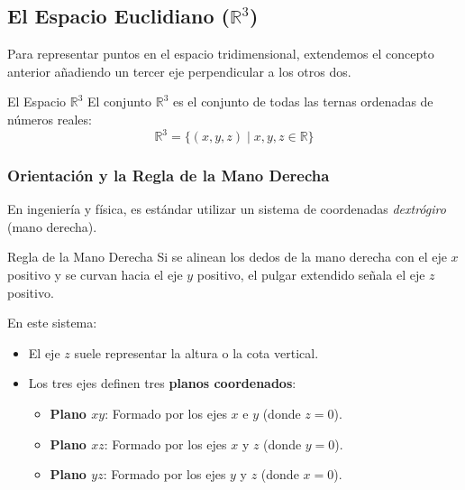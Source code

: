 \subsection{El Espacio Euclidiano ($\mathbb{R}^3$)}

Para representar puntos en el espacio tridimensional, extendemos el concepto anterior añadiendo un tercer eje perpendicular a los otros dos.

\begin{mydefinition}{El Espacio $\mathbb{R}^3$}
El conjunto $\mathbb{R}^3$ es el conjunto de todas las ternas ordenadas de números reales:
$$ \mathbb{R}^3 = \{ (x, y, z) \mid x, y, z \in \mathbb{R} \} $$
\end{mydefinition}

\subsubsection{Orientación y la Regla de la Mano Derecha}
En ingeniería y física, es estándar utilizar un sistema de coordenadas \textit{dextrógiro} (mano derecha). 
\begin{mynote}{Regla de la Mano Derecha}
Si se alinean los dedos de la mano derecha con el eje $x$ positivo y se curvan hacia el eje $y$ positivo, el pulgar extendido señala el eje $z$ positivo.
\end{mynote}
\begin{center}
\begin{minipage}{.9\textwidth}
\centering
\begingroup\shorthandoff{>}
\def\manoPrimero{x}\def\manoSegundo{y}\def\manoResultado{z}

\endgroup
\end{minipage}
\end{center}


En este sistema:
\begin{itemize}
    \item El eje $z$ suele representar la altura o la cota vertical.
    \item Los tres ejes definen tres \textbf{planos coordenados}:
    \begin{itemize}
        \item \textbf{Plano $xy$}: Formado por los ejes $x$ e $y$ (donde $z=0$).
        \item \textbf{Plano $xz$}: Formado por los ejes $x$ y $z$ (donde $y=0$).
        \item \textbf{Plano $yz$}: Formado por los ejes $y$ y $z$ (donde $x=0$).
    \end{itemize}
\end{itemize}


